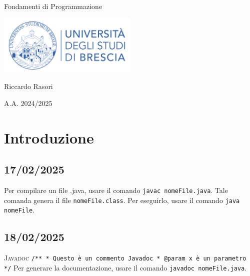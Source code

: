 \documentclass{report}
\begin{document}
\begin{center}
  \vspace*{2cm}
  {\Huge Fondamenti di Programmazione \par}
  \vspace{1cm}
  \includegraphics[width=0.5\textwidth]{logounibs.png}\par
  \vspace{1cm}
  {\Large Riccardo Rasori \par}
  \vspace{0.5cm}
  {\large A.A. 2024/2025 \par}
  \vspace{2cm}
\end{center}

\tableofcontents %

\chapter{Introduzione}
\section{17/02/2025}


\begin{important}
  Per compilare un file .java, usare il comando \texttt{javac nomeFile.java}.
  Tale comanda genera il file \texttt{nomeFile.class}.
  Per eseguirlo, usare il comando \texttt{java nomeFile}.
\end{important}

\section{18/02/2025}
\vspace{0.5cm}
\textsc{Javadoc}\newline
\texttt{/** \newline
  * Questo è un commento Javadoc \newline
  * @param x è un parametro \newline
  */\newline}
\vspace{0.2cm}
\textnormal{Per generare la documentazione, usare il comando \texttt{javadoc nomeFile.java}.}
\end{document}
